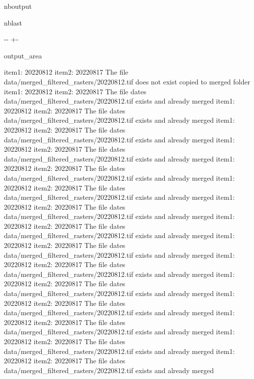 \documentclass[letterpaper,10pt]{sphinxmanual}
\newlength\nbsphinxcodecellspacing
\begin{document}
\begin{sphinxuseclass}{nboutput}
\begin{sphinxuseclass}{nblast}
{

\kern-\sphinxverbatimsmallskipamount\kern-\baselineskip
\kern+\FrameHeightAdjust\kern-\fboxrule
\vspace{\nbsphinxcodecellspacing}

\begin{sphinxuseclass}{output_area}
\begin{sphinxuseclass}{}


\begin{sphinxVerbatim}[commandchars=\\\{\}]
item1:  20220812
item2:  20220817
The file data/merged\_filtered\_rasters/20220812.tif does not exist copied to merged folder
item1:  20220812
item2:  20220817
The file dates data/merged\_filtered\_rasters/20220812.tif exists and already merged
item1:  20220812
item2:  20220817
The file dates data/merged\_filtered\_rasters/20220812.tif exists and already merged
item1:  20220812
item2:  20220817
The file dates data/merged\_filtered\_rasters/20220812.tif exists and already merged
item1:  20220812
item2:  20220817
The file dates data/merged\_filtered\_rasters/20220812.tif exists and already merged
item1:  20220812
item2:  20220817
The file dates data/merged\_filtered\_rasters/20220812.tif exists and already merged
item1:  20220812
item2:  20220817
The file dates data/merged\_filtered\_rasters/20220812.tif exists and already merged
item1:  20220812
item2:  20220817
The file dates data/merged\_filtered\_rasters/20220812.tif exists and already merged
item1:  20220812
item2:  20220817
The file dates data/merged\_filtered\_rasters/20220812.tif exists and already merged
item1:  20220812
item2:  20220817
The file dates data/merged\_filtered\_rasters/20220812.tif exists and already merged
item1:  20220812
item2:  20220817
The file dates data/merged\_filtered\_rasters/20220812.tif exists and already merged
item1:  20220812
item2:  20220817
The file dates data/merged\_filtered\_rasters/20220812.tif exists and already merged
item1:  20220812
item2:  20220817
The file dates data/merged\_filtered\_rasters/20220812.tif exists and already merged
item1:  20220812
item2:  20220817
The file dates data/merged\_filtered\_rasters/20220812.tif exists and already merged
item1:  20220812
item2:  20220817
The file dates data/merged\_filtered\_rasters/20220812.tif exists and already merged
item1:  20220812
item2:  20220817
The file dates data/merged\_filtered\_rasters/20220812.tif exists and already merged

\end{sphinxVerbatim}
\end{sphinxuseclass}
\end{sphinxuseclass}}
\end{sphinxuseclass}
\end{sphinxuseclass}
\end{document}
